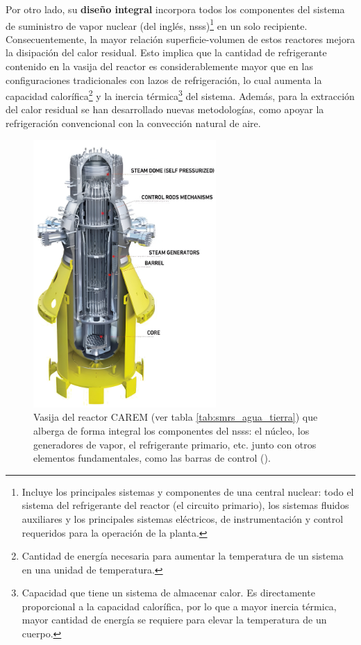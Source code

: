 Por otro lado, su \textbf{diseño integral} incorpora todos los componentes del \gls{sistema de suministro de vapor nuclear} (del inglés, \acrshort{nsss})\footnote{Incluye los principales sistemas y componentes de una central nuclear: todo el sistema del refrigerante del reactor (el circuito primario), los sistemas fluidos auxiliares y los principales sistemas eléctricos, de instrumentación y control requeridos para la operación de la planta.} en un solo recipiente. Consecuentemente, la mayor relación superficie-volumen de estos reactores mejora la disipación del calor residual. Esto implica que la cantidad de refrigerante contenido en la vasija del reactor es considerablemente mayor que en las configuraciones tradicionales con lazos de refrigeración, lo cual aumenta la capacidad calorífica\footnote{Cantidad de energía necesaria para aumentar la temperatura de un sistema en una unidad de temperatura.} y la inercia térmica\footnote{Capacidad que tiene un sistema de almacenar calor. Es directamente proporcional a la capacidad calorífica, por lo que a mayor inercia térmica, mayor cantidad de energía se requiere para elevar la temperatura de un cuerpo.} del sistema. Además, para la extracción del calor residual se han desarrollado nuevas metodologías, como apoyar la refrigeración convencional con la convección natural de aire.

\begin{figure}[h]
  \centering
  \includegraphics[width=0.62\textwidth]{content/figures/carem.jpeg}
  \caption{Vasija del reactor CAREM (ver tabla \ref{tab:smrs_agua_tierra}) que alberga de forma integral los componentes del \acrshort{nsss}: el núcleo, los generadores de vapor, el refrigerante primario, etc. junto con otros elementos fundamentales, como las barras de control (\cite{iaea_smr_booklet_2022}).}
  \label{fig:carem}
\end{figure}

